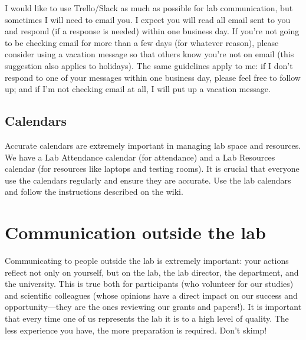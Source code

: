 \documentclass[letterpaper,12pt,oneside]{memoir}
\begin{document}
I would like to use Trello/Slack as much as possible for lab communication, but sometimes I will need to email you. I expect you will read all email sent to you and respond (if a response is needed) within one business day. If you're not going to be checking email for more than a few days (for whatever reason), please consider using a vacation message so that others know you're not on email (this suggestion also applies to holidays). The same guidelines apply to me: if I don't respond to one of your messages within one business day, please feel free to follow up; and if I'm not checking email at all, I will put up a vacation message. 


\subsection{Calendars}

Accurate calendars are extremely important in managing lab space and resources. We have a Lab Attendance calendar (for attendance) and a Lab Resources calendar (for resources like laptops and testing rooms). It is crucial that everyone use the calendars regularly and ensure they are accurate. Use the lab calendars and follow the instructions described on the wiki.






\section{Communication outside the lab}

Communicating to people outside the lab is extremely important: your actions reflect not only on yourself, but on the lab, the lab director, the department, and the university. This is true both for participants (who volunteer for our studies) and scientific colleagues (whose opinions have a direct impact on our success and opportunity---they are the ones reviewing our grants and papers!). It is important that every time one of us represents the lab it is to a high level of quality. The less experience you have, the more preparation is required. Don't skimp!
\end{document}
